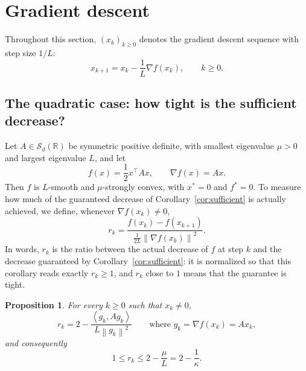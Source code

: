 \documentclass[11pt,a4paper]{article}
\newtheorem{proposition}{Proposition}
\theoremstyle{definition}
\theoremstyle{remark}
\newcommand{\R}{\mathbb{R}}
\newcommand{\norm}[1]{\left\lVert #1 \right\rVert}
\newcommand{\ip}[2]{\left\langle #1, #2 \right\rangle}
\begin{document}
\section{Gradient descent}\label{sec:gd}
Throughout this section, $(x_k)_{k \ge 0}$ denotes the gradient descent sequence with step size $1/L$:
\[
x_{k+1} = x_k - \frac{1}{L}\nabla f(x_k), \qquad k \ge 0.
\]

\subsection{The quadratic case: how tight is the sufficient decrease?}\label{sec:quadratic}
Let $A \in \mathcal{S}_d(\R)$ be symmetric positive definite, with smallest eigenvalue $\mu > 0$ and largest eigenvalue $L$, and let
\[
f(x) = \frac12 x^\top A x, \qquad \nabla f(x) = Ax .
\]
Then $f$ is $L$-smooth and $\mu$-strongly convex, with $x^\ast = 0$ and $f^\ast = 0$. To measure how much of the guaranteed decrease of Corollary~\ref{cor:sufficient} is actually achieved, we define, whenever $\nabla f(x_k) \neq 0$,
\[
r_k = \frac{f(x_k) - f(x_{k+1})}{\frac{1}{2L}\norm{\nabla f(x_k)}^2} .
\]
In words, $r_k$ is the ratio between the actual decrease of $f$ at step $k$ and the decrease guaranteed by Corollary~\ref{cor:sufficient}: it is normalized so that this corollary reads exactly $r_k \ge 1$, and $r_k$ close to $1$ means that the guarantee is tight.

\begin{proposition}\label{prop:rk}
For every $k \ge 0$ such that $x_k \neq 0$,
\[
r_k = 2 - \frac{\ip{g_k}{A g_k}}{L \norm{g_k}^2} \qquad \text{where } g_k = \nabla f(x_k) = A x_k,
\]
and consequently
\[
1 \le r_k \le 2 - \frac{\mu}{L} = 2 - \frac{1}{\kappa}.
\]
\end{proposition}
\end{document}
